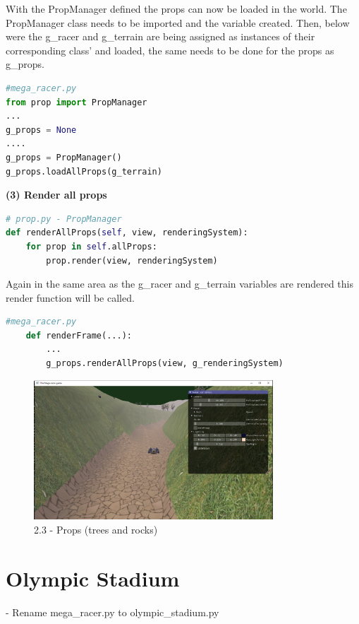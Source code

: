 \documentclass[a4 paper, 12pt]{article}
\begin{document}
With the PropManager defined the props can now be loaded in the world. The PropManager class needs to be imported and the variable created. Then, below were the g\_racer and g\_terrain are being assigned as instances of their corresponding class' and loaded, the same needs to be done for the props as g\_props.

    \begin{lstlisting}[language=python]
#mega_racer.py
from prop import PropManager
...
g_props = None
....
g_props = PropManager()
g_props.loadAllProps(g_terrain)
    \end{lstlisting}


\textbf{(3) Render all props}   
    \begin{lstlisting}[language=python]
# prop.py - PropManager 
def renderAllProps(self, view, renderingSystem):
    for prop in self.allProps:
        prop.render(view, renderingSystem)
    \end{lstlisting}

Again in the same area as the g\_racer and g\_terrain variables are rendered this render function will be called. 
    \begin{lstlisting}[language=python]
    #mega_racer.py    
    def renderFrame(...):
        ...
        g_props.renderAllProps(view, g_renderingSystem)
    \end{lstlisting}

    \begin{figure} [H]
        \centering
        \includegraphics[width=0.8\textwidth, frame]
            {./images/mega_racer/2.3.PNG}  
        \caption{2.3 - Props (trees and rocks)}   
    \end{figure}



\section{Olympic Stadium}
- Rename mega\_racer.py to olympic\_stadium.py
\end{document}

